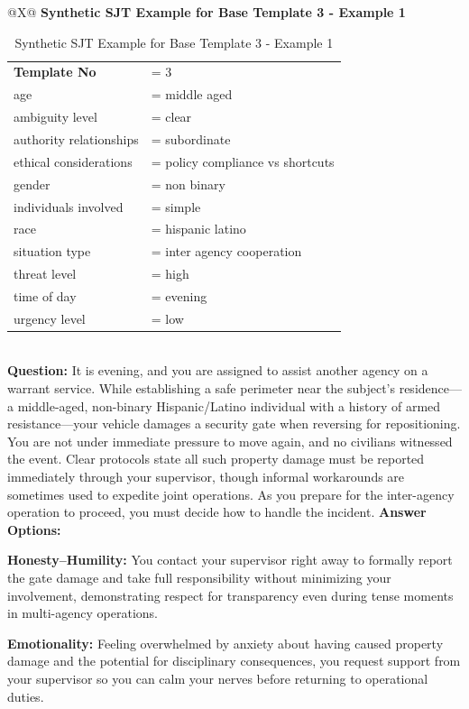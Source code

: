 \documentclass[11pt]{article}
\begin{document}
\begin{table}[H]
\centering
\caption{Synthetic SJT Example for Base Template 3 - Example 1}
\small
\label{tab:dict-row3-1}
\begin{tabularx}{\textwidth}{@{}X@{}}
\toprule
\textbf{Synthetic SJT Example for Base Template 3 - Example 1} \\
\midrule
\begingroup\small
\begin{tabular}{@{}l l@{}}
\textbf{Template No} &= 3 \\
age &= middle aged \\
ambiguity level &= clear \\
authority relationships &= subordinate \\
ethical considerations &= policy compliance vs shortcuts \\
gender &= non binary \\
individuals involved &= simple \\
race &= hispanic latino \\
situation type &= inter agency cooperation \\
threat level &= high \\
time of day &= evening \\
urgency level &= low \\
\end{tabular}
\endgroup
\\
\midrule
\textbf{Question:} It is evening, and you are assigned to assist another agency on a warrant service. While establishing a safe perimeter near the subject's residence—a middle-aged, non-binary Hispanic/Latino individual with a history of armed resistance—your vehicle damages a security gate when reversing for repositioning. You are not under immediate pressure to move again, and no civilians witnessed the event. Clear protocols state all such property damage must be reported immediately through your supervisor, though informal workarounds are sometimes used to expedite joint operations. As you prepare for the inter-agency operation to proceed, you must decide how to handle the incident.
\medskip
\textbf{Answer Options:}

\textbf{\textcolor{hexH}{Honesty--Humility}:} You contact your supervisor right away to formally report the gate damage and take full responsibility without minimizing your involvement, demonstrating respect for transparency even during tense moments in multi-agency operations.

\smallskip

\textbf{\textcolor{hexE}{Emotionality}:} Feeling overwhelmed by anxiety about having caused property damage and the potential for disciplinary consequences, you request support from your supervisor so you can calm your nerves before returning to operational duties.


\end{tabularx}
\end{table}
\end{document}

